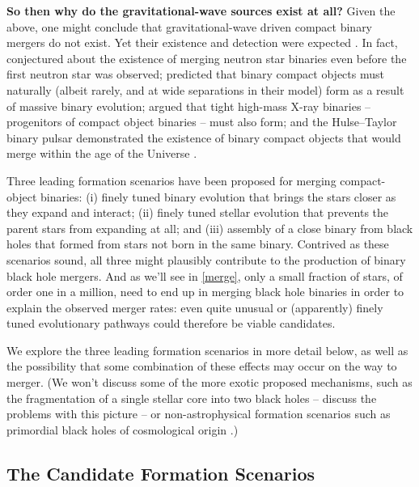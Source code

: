 \documentclass[iop,onecolumn]{revtex4-1}
\begin{document}
\textbf{So then why do the gravitational-wave sources exist at all?} Given the above, one might conclude that gravitational-wave driven compact binary mergers do not exist. Yet their existence and detection were expected \citep{ratesdoc}. In fact, \citet{Dyson:1962} conjectured about the existence of merging neutron star binaries even before the first neutron star was observed; \citet{Tutukov:1973} predicted that binary compact objects must naturally (albeit rarely, and at wide separations in their model) form as a result of massive binary evolution; \citet{vdHDeLoore:1973} argued that tight high-mass X-ray binaries -- progenitors of compact object binaries -- must also form; and the Hulse--Taylor binary pulsar \citep{HulseTaylor:1975} demonstrated the existence of binary compact objects that would merge within the age of the Universe \citep[for early explanations of its formation in the context of binary evolution, see][]{FlanneryvdH:1975,DeLoore:1975}.

Three leading formation scenarios have been proposed for merging compact-object binaries: (i) finely tuned binary evolution that brings the stars closer as they expand and interact; (ii) finely tuned stellar evolution that prevents the parent stars from expanding at all; and (iii) assembly of a close binary from black holes that formed from stars not born in the same binary. Contrived as these scenarios sound, all three might plausibly contribute to the production of binary black hole mergers.  And as we'll see in \autoref{merge}, only a small fraction of stars, of order one in a million, need to end up in merging black hole binaries in order to explain the observed merger rates: even quite unusual or (apparently) finely tuned evolutionary pathways could therefore be viable candidates.

We explore the three leading formation scenarios in more detail below, as well as the possibility that some combination of these effects may occur on the way to merger. (We won't discuss some of the more exotic proposed mechanisms, such as the fragmentation of a single stellar core into two black holes \citep{Loeb:2016} -- \citet{Woosley:2016,Dai:2017} discuss the problems with this picture -- or non-astrophysical formation scenarios such as primordial black holes of cosmological origin \citep[e.g.,][]{Bird:2016}.)

\subsection{The Candidate Formation Scenarios}
\end{document}
